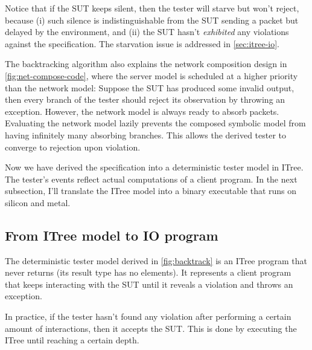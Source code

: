 \begin{enumerate}
  Notice that if the SUT keeps silent, then the tester will starve but won't
  reject, because (i) such silence is indistinguishable from the SUT sending a
  packet but delayed by the environment, and (ii) the SUT hasn't {\em exhibited}
  any violations against the specification.  The starvation issue is addressed
  in \autoref{sec:itree-io}.
\end{enumerate}

The backtracking algorithm also explains the network composition design
in \autoref{fig:net-compose-code}, where the server model is scheduled at a
higher priority than the network model: Suppose the SUT has produced some
invalid output, then every branch of the tester should reject its observation by
throwing an exception.  However, the network model is always ready to absorb
packets.  Evaluating the network model lazily prevents the composed symbolic
model from having infinitely many absorbing branches.  This allows the derived
tester to converge to rejection upon violation.

Now we have derived the specification into a deterministic tester model in
ITree.  The tester's events reflect actual computations of a client program.  In
the next subsection, I'll translate the ITree model into a binary executable
that runs on silicon and metal.

\subsection{From ITree model to IO program}
\label{sec:itree-io}
The deterministic tester model derived in \autoref{fig:backtrack} is an ITree
program that never returns (its result type  has no elements).  It
represents a client program that keeps interacting with the SUT until it reveals
a violation and throws an exception.

In practice, if the tester hasn't found any violation after performing a certain
amount of interactions, then it accepts the SUT.  This is done by executing the
ITree until reaching a certain depth.

